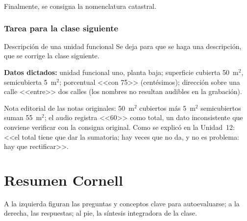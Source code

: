 \documentclass[12pt,oneside]{book}
\newcommand{\mcuad}{$\mathrm{m}^2$}
\begin{document}
Finalmente, se consigna la nomenclatura catastral.

\subsection{Tarea para la clase siguiente}

\begin{exercise}{Descripción de una unidad funcional}
Se deja para que se haga una descripción, que se corrige la clase siguiente.

\textbf{Datos dictados:} unidad funcional uno, planta baja; superficie cubierta 50~\mcuad, semicubierta 5~\mcuad; porcentual <<con 75>> (centésimos); dirección sobre una calle <<entre>> dos calles (los nombres no resultan audibles en la grabación).
\end{exercise}

\begin{note}
Nota editorial de las notas originales: 50~\mcuad{} cubiertos más 5~\mcuad{} semicubiertos suman 55~\mcuad; el audio registra <<60>> como total, un dato inconsistente que conviene verificar con la consigna original. Como se explicó en la Unidad~12: <<el total tiene que dar la sumatoria; hay veces que no da, y no es problema: hay que rectificar>>.
\end{note}


\chapter*{Resumen Cornell}

A la izquierda figuran las preguntas y conceptos clave para autoevaluarse; a la derecha, las respuestas; al pie, la síntesis integradora de la clase.
\end{document}
